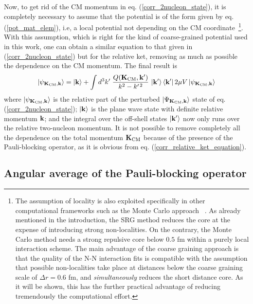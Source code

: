 \documentclass[aps,twocolumn,showpacs,preprintnumbers,amsmath,amssymb,nofootinbib,superscriptaddress,showkeys,noeprint]{revtex4-1}
\newcommand{\nk}{{\bf k}}
\newcommand{\nK}{{\bf K}}
\begin{document}
 Now, to get rid of the CM momentum in
 eq. (\ref{corr_2nucleon_state}), it is completely necessary to assume
 that the potential is of the form given by eq. (\ref{pot_mat_elem}),
 i.e, a local potential not depending on the CM
 coordinate~\footnote{The assumption of locality is also exploited
 specifically in other computational frameworks such as the Monte
 Carlo approach~ \cite{Carlson:1993zz, Forest:1995zz,
   Quaglioni:2009mn, Hagen:2010gd, Leidemann:2012hr, Barrett:2013nh}.
 As already mentioned in the introduction, the SRG method reduces the
 core at the expense of introducing strong non-localities. On the
 contrary, the Monte Carlo method needs a strong repulsive core below
 $0.5$ fm within a purely local interaction scheme. The main advantage
 of the coarse graining approach is that the quality of the N-N
 interaction fits is compatible with the assumption that possible
 non-localities take place at distances below the coarse graining
 scale of $\Delta r=0.6$ fm, and {\it simultaneously} reduces the
 short distance core. As it will be shown, this has the further
 practical advantage of reducing tremendously the computational
 effort.}.  With this assumption, which is right for the kind of
 coarse-grained potential used in this work, one can obtain a similar
 equation to that given in (\ref{corr_2nucleon_state}) but for the
 relative ket, removing as much as possible the dependence on the CM
 momentum. The final result is
 \begin{equation}\label{corr_relative_ket_equation}
 \left| \psi_{\nK_{\rm CM},\nk} \right\rangle=
 \left| \nk \right\rangle + \int d^3k^\prime \; 
 \frac{Q(\nK_{\rm CM},\nk^\prime)}{k^2-k^{\prime\,2}}\,
 \left| \nk^\prime \right\rangle \left\langle \nk^\prime \right|
 2\mu V \left| \psi_{\nK_{\rm CM},\nk} \right\rangle
 \end{equation}
 where $\left| \psi_{\nK_{\rm CM},\nk} \right\rangle$ is the relative
 part of the perturbed $\left| \Psi_{\nK_{\rm CM},\nk} \right\rangle$
 state of eq.  (\ref{corr_2nucleon_state}); $\left| \nk \right\rangle$
 is the plane wave state with definite relative momentum $\nk$; and
 the integral over the off-shell states $\left| \nk^\prime
 \right\rangle$ now only runs over the relative two-nucleon
 momentum. It is not possible to remove completely all the dependence
 on the total momentum $\nK_{\rm CM}$ because of the presence of the
 Pauli-blocking operator, as it is obvious from
 eq. (\ref{corr_relative_ket_equation}).
 
 
\subsection{Angular average of the Pauli-blocking operator}
\label{ang_average}
\end{document}
